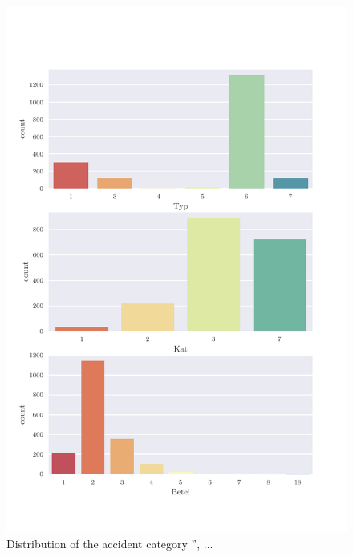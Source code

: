 \documentclass[a4paper,headsepline,footsepline,fontsize=11pt,BCOR=12mm,DIV=12]{report}
\begin{document}
\begin{appendices}
\begin{figure}[h]
	\centering
	\includegraphics[scale=0.7]{../CorrAnalysis/data/BAYSIS/03_selected_01_startJam/plots/baysis_selected_count_multiple01}
	\caption{Distribution of the accident category '', ...}
	\label{img:appendix_baysis_selected_01_01}
\end{figure}


\end{appendices}
\end{document}
